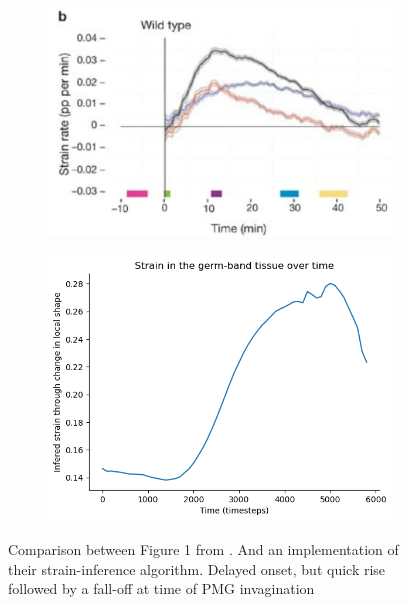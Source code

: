 \begin{figure}[H]
    \centering
    \begin{subfigure}{0.45\linewidth}
        \centering
        \includegraphics[width = \linewidth]{chapters/Results/figures/strain_rate_extrinsic.png}
    \end{subfigure}
        \begin{subfigure}{0.45\linewidth}
        \centering
        \includegraphics[width = \linewidth]{chapters/Results/figures/strain_smoothedpng.png}
    \end{subfigure}
    \caption{Comparison between Figure 1 from \cite{butler2009cell}. And an implementation of their strain-inference algorithm. Delayed onset, but quick rise followed by a fall-off at time of PMG invagination\\}
    \label{fig:strain}
\end{figure}

